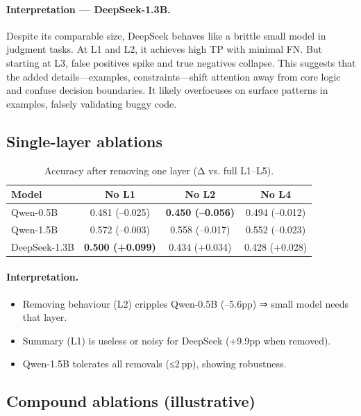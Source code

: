 \documentclass[a4paper]{usiinfbachelorproject}
\begin{document}
\paragraph*{Interpretation — DeepSeek-1.3B.}
Despite its comparable size, DeepSeek behaves like a brittle small model in judgment tasks. At L1 and L2, it achieves high TP with minimal FN. But starting at L3, false positives spike and true negatives collapse. This suggests that the added details—examples, constraints—shift attention away from core logic and confuse decision boundaries. It likely overfocuses on surface patterns in examples, falsely validating buggy code.



\subsection{Single-layer ablations}

\begin{table}[H]\centering
\caption{Accuracy after removing one layer (Δ vs. full L1–L5).}
\begin{tabular}{lccc}
\toprule
\textbf{Model} & \textbf{No L1} & \textbf{No L2} & \textbf{No L4} \\ \midrule
Qwen-0.5B  & 0.481 (–0.025) & \textbf{0.450 (–0.056)} & 0.494 (–0.012) \\
Qwen-1.5B  & 0.572 (–0.003) & 0.558 (–0.017) & 0.552 (–0.023) \\
DeepSeek-1.3B & \textbf{0.500 (+0.099)} & 0.434 (+0.034) & 0.428 (+0.028) \\
\bottomrule
\end{tabular}
\end{table}

\paragraph*{Interpretation.}
\begin{itemize}[leftmargin=12pt,itemsep=0pt]
  \item Removing behaviour (L2) cripples Qwen-0.5B (–5.6pp) ⇒ small model needs that layer.  
  \item Summary (L1) is useless or noisy for DeepSeek (+9.9pp when removed).  
  \item Qwen-1.5B tolerates all removals (≤2 pp), showing robustness.
\end{itemize}

\subsection{Compound ablations (illustrative)}
\end{document}
